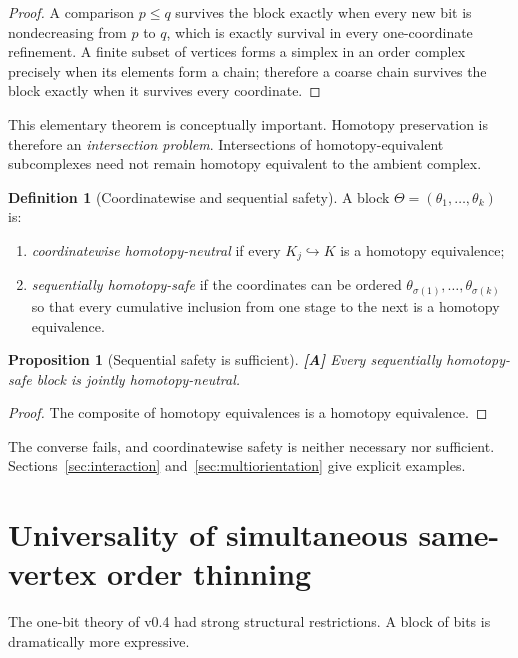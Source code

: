 \documentclass[11pt]{article}
\newtheorem{proposition}[theorem]{Proposition}
\theoremstyle{definition}
\newtheorem{definition}[theorem]{Definition}
\newcommand{\statusA}{\textbf{[A]}}
\begin{document}
\begin{proof}
A comparison $p\le q$ survives the block exactly when every new bit is nondecreasing from $p$ to $q$, which is exactly survival in every one-coordinate refinement. A finite subset of vertices forms a simplex in an order complex precisely when its elements form a chain; therefore a coarse chain survives the block exactly when it survives every coordinate.
\end{proof}

This elementary theorem is conceptually important. Homotopy preservation is therefore an \emph{intersection problem}. Intersections of homotopy-equivalent subcomplexes need not remain homotopy equivalent to the ambient complex.

\begin{definition}[Coordinatewise and sequential safety]
A block $\Theta=(\theta_1,\dots,\theta_k)$ is:
\begin{enumerate}[label=(\roman*)]
\item \emph{coordinatewise homotopy-neutral} if every $K_j\hookrightarrow K$ is a homotopy equivalence;
\item \emph{sequentially homotopy-safe} if the coordinates can be ordered $\theta_{\sigma(1)},\dots,\theta_{\sigma(k)}$ so that every cumulative inclusion from one stage to the next is a homotopy equivalence.
\end{enumerate}
\end{definition}

\begin{proposition}[Sequential safety is sufficient]\label{prop:sequential}
\statusA\;
Every sequentially homotopy-safe block is jointly homotopy-neutral.
\end{proposition}

\begin{proof}
The composite of homotopy equivalences is a homotopy equivalence.
\end{proof}

The converse fails, and coordinatewise safety is neither necessary nor sufficient. Sections~\ref{sec:interaction} and~\ref{sec:multiorientation} give explicit examples.

\section{Universality of simultaneous same-vertex order thinning}

The one-bit theory of v0.4 had strong structural restrictions. A block of bits is dramatically more expressive.
\end{document}
